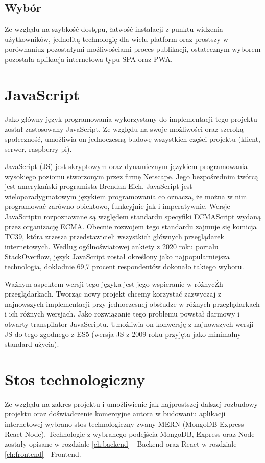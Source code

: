 \subsection{Wybór}
Ze względu na szybkość dostępu, łatwość instalacji z punktu widzenia użytkowników, jednolitą technologię dla wielu platform oraz prostszy w porównaniu\newline z pozostałymi możliwościami proces publikacji, ostatecznym wyborem pozostała aplikacja internetowa typu SPA oraz PWA.

\section{JavaScript}
Jako główny język programowania wykorzystany do implementacji tego projektu został zastosowany JavaScript. Ze względu na swoje możliwości oraz szeroką społeczność, umożliwia on jednoczesną budowę wszystkich części projektu (klient, serwer, raspberry pi).

JavaScript (JS) jest skryptowym oraz dynamicznym językiem programowania wysokiego poziomu stworzonym przez firmę Netscape. Jego bezpośrednim twórcą jest amerykański programista Brendan Eich. JavaScript jest wieloparadygmatowym językiem programowania co oznacza, że można w nim programować zarówno obiektowo, funkcyjnie jak i imperatywnie. Wersje JavaScriptu rozpoznawane są względem standardu specyfiki ECMAScript wydaną przez organizację ECMA. Obecnie rozwojem tego standardu zajmuje się komicja TC39, która zrzesza przedstawicieli wszystkich głównych przeglądarek internetowych.\cite{JavaScriptBasics} Według ogólnoświatowej ankiety z 2020 roku portalu StackOverflow, język JavaScript został określony jako najpopularniejsza technologia, dokładnie 69,7 procent respondentów dokonało takiego wyboru.\cite{StackOverflowSurvey}

Ważnym aspektem wersji tego języka jest jego wspieranie w różnycŹh przeglądarkach. Tworząc nowy projekt chcemy korzystać zazwyczaj z najnowszych implementacji przy jednoczesnej obsłudze w różnych przeglądarkach i ich różnych wersjach. Jako rozwiązanie tego problemu powstał darmowy i otwarty transpilator JavaScriptu. Umożliwia on konwersję z najnowszych wersji JS do tego zgodnego z ES5 (wersja JS z 2009 roku przyjęta jako minimalny standard użycia).

\section{Stos technologiczny}
Ze względu na zakres projektu i umożliwienie jak najprostszej dalszej rozbudowy projektu oraz doświadczenie komercyjne autora w budowaniu aplikacji internetowej wybrano stos technologiczny zwany MERN (MongoDB-Express-React-Node). Technologie z wybranego podejścia MongoDB, Express oraz Node zostały opisane w rozdziale \ref{ch:backend} - Backend oraz React w rozdziale \ref{ch:frontend} - Frontend.

